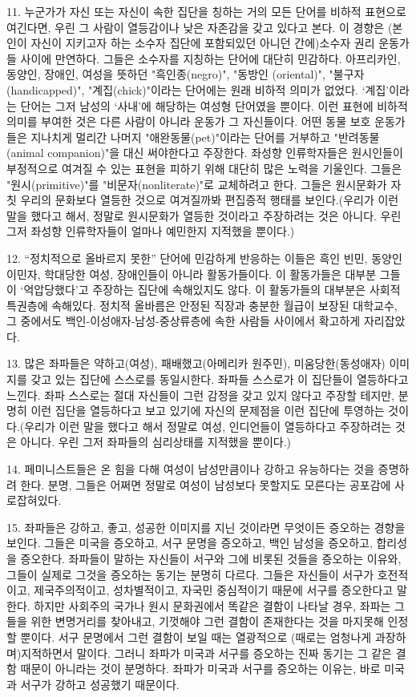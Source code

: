 \documentclass[11pt,a4paper]{article}
\begin{document}
\begin{multicols}{2}
11. 누군가가 자신 또는 자신이 속한 집단을 칭하는 거의 모든 단어를 비하적 표현으로 여긴다면, 우린 그 사람이 열등감이나 낮은 자존감을 갖고 있다고 본다. 이 경향은 (본인이 자신이 지키고자 하는 소수자  집단에 포함되있던 아니던 간에)소수자 권리 운동가들 사이에 만연하다. 그들은 소수자를 지칭하는  단어에 대단히 민감하다. 아프리카인, 동양인, 장애인, 여성을 뜻하던 "흑인종(negro)", "동방인 (oriental)", "불구자(handicapped)", "계집(chick)"이라는 단어에는 원래 비하적 의미가 없었다. `계집'이라는 단어는 그저 남성의 `사내'에 해당하는 여성형 단어였을 뿐이다. 이런 표현에 비하적 의미를  부여한 것은 다른 사람이 아니라 운동가 그 자신들이다. 어떤 동물 보호 운동가들은 지나치게 멀리간  나머지 "애완동물(pet)"이라는 단어를 거부하고 "반려동물(animal companion)"을 대신 써야한다고  주장한다. 좌성향 인류학자들은 원시인들이 부정적으로 여겨질 수 있는 표현을 피하기 위해 대단히 많은  노력을 기울인다. 그들은 "원시(primitive)"를 "비문자(nonliterate)"로 교체하려고 한다. 그들은  원시문화가 자칫 우리의 문화보다 열등한 것으로 여겨질까봐 편집증적 행태를 보인다.(우리가 이런 말을  했다고 해서, 정말로 원시문화가 열등한 것이라고 주장하려는 것은 아니다. 우린 그저 좌성향 인류학자들이 얼마나 예민한지 지적했을 뿐이다.)  


12. “정치적으로 올바르지 못한” 단어에 민감하게 반응하는 이들은 흑인 빈민, 동양인 이민자, 학대당한  여성, 장애인들이 아니라 활동가들이다. 이 활동가들은 대부분 그들이 `억압당했다'고 주장하는 집단에  속해있지도 않다. 이 활동가들의 대부분은 사회적 특권층에 속해있다. 정치적 올바름은 안정된 직장과  충분한 월급이 보장된 대학교수, 그 중에서도 백인-이성애자-남성-중상류층에 속한 사람들 사이에서  확고하게 자리잡았다. 


13. 많은 좌파들은 약하고(여성), 패배했고(아메리카 원주민), 미움당한(동성애자) 이미지를 갖고 있는  집단에 스스로를 동일시한다. 좌파들 스스로가 이 집단들이 열등하다고 느낀다. 좌파 스스로는 절대  자신들이 그런 감정을 갖고 있지 않다고 주장할 테지만, 분명히 이런 집단을 열등하다고 보고 있기에  자신의 문제점을 이런 집단에 투영하는 것이다.(우리가 이런 말을 했다고 해서 정말로 여성, 인디언들이  열등하다고 주장하려는 것은 아니다. 우린 그저 좌파들의 심리상태를 지적했을 뿐이다.)


14. 페미니스트들은 온 힘을 다해 여성이 남성만큼이나 강하고 유능하다는 것을 증명하려 한다. 분명,  그들은 어쩌면 정말로 여성이 남성보다 못할지도 모른다는 공포감에 사로잡혀있다. 


15. 좌파들은 강하고, 좋고, 성공한 이미지를 지닌 것이라면 무엇이든 증오하는 경향을 보인다. 그들은  미국을 증오하고, 서구 문명을 증오하고, 백인 남성을 증오하고, 합리성을 증오한다. 좌파들이 말하는  자신들이 서구와 그에 비롯된 것들을 증오하는 이유와, 그들이 실제로 그것을 증오하는 동기는 분명히  다르다. 그들은 자신들이 서구가 호전적이고, 제국주의적이고, 성차별적이고, 자국민 중심적이기 때문에  서구를 증오한다고 말한다. 하지만 사회주의 국가나 원시 문화권에서 똑같은 결함이 나타날 경우, 좌파는  그들을 위한 변명거리를 찾아내고, 기껏해야 그런 결함이 존재한다는 것을 마지못해 인정할 뿐이다. 서구 문명에서 그런 결함이 보일 때는 열광적으로 (때로는 엄청나게 과장하며)지적하면서 말이다. 그러니  좌파가 미국과 서구를 증오하는 진짜 동기는 그 같은 결함 때문이 아니라는 것이 분명하다. 좌파가 미국과 서구를 증오하는 이유는, 바로 미국과 서구가 강하고 성공했기 때문이다. 



\end{multicols}
\end{document}
